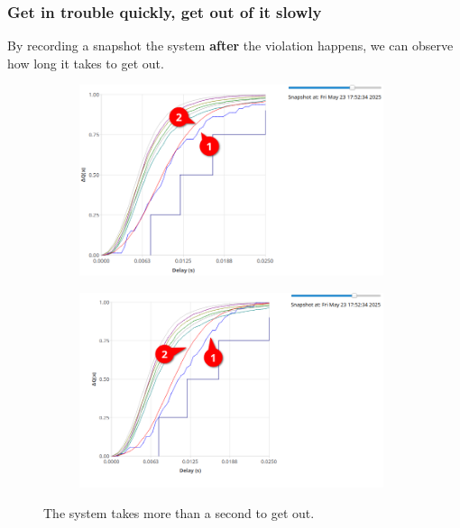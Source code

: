         \subsubsection{Get in trouble quickly, get out of it slowly}
            By recording a snapshot the system \textbf{after} the violation happens, we can observe how long it takes to get out. 
        \begin{figure}[H]
            \centering
            \begin{subfigure}{.5\textwidth}
                \centering
                \includegraphics[width=0.98\textwidth]{img/getting_bacl1.png}
                \label{fig:recup_1}
            \end{subfigure}%
            \begin{subfigure}{.5\textwidth}
                \centering
                \includegraphics[width =0.98\textwidth]{img/still_bad12.png}
                \label{fig:recup_2}
            \end{subfigure}
            \label{fig:recup}
            \caption{The system takes more than a second to get out.}
            \end{figure}
            
